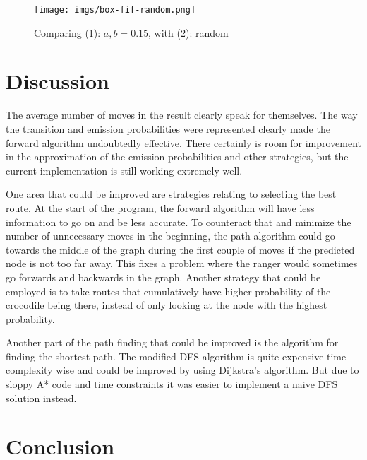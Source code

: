 \documentclass[12pt, a4paper]{article}
\begin{document}
\begin{figure}[!ht]
\centering
\texttt{[image: imgs/box-fif-random.png]}\\
\caption{Comparing (1): $a,b=0.15$, with (2): random}
\label{fig:box-fif-random.png}
\end{figure}

\section{Discussion}

The average number of moves in the result clearly speak for themselves. The way the transition and emission probabilities were represented clearly made the forward algorithm undoubtedly effective. There certainly is room for improvement in the approximation of the emission probabilities and other strategies, but the current implementation is still working extremely well.

One area that could be improved are strategies relating to selecting the best route. At the start of the program, the forward algorithm will have less information to go on and be less accurate. To counteract that and minimize the number of unnecessary moves in the beginning, the path algorithm could go towards the middle of the graph during the first couple of moves if the predicted node is not too far away. This fixes a problem where the ranger would sometimes go forwards and backwards in the graph. Another strategy that could be employed is to take routes that cumulatively have higher probability of the crocodile being there, instead of only looking at the node with the highest probability.

Another part of the path finding that could be improved is the algorithm for finding the shortest path. The modified DFS algorithm is quite expensive time complexity wise and could be improved by using Dijkstra's algorithm. But due to sloppy A* code and time constraints it was easier to implement a naive DFS solution instead.


\section{Conclusion}
\end{document}
